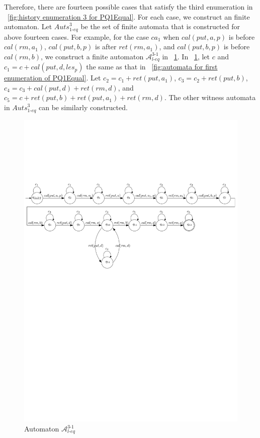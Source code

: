 Therefore, there are fourteen possible cases that satisfy the third enumeration in \figurename~\ref{fig:history enumeration 3 for PQ1Equal}. For each case, we construct an finite automaton. Let $\textit{Auts}_{\textit{1-eq}}^{3}$ be the set of finite automata that is constructed for above fourteen cases. For example, for the case $\textit{ca}_1$ when $\textit{cal}(\textit{put},a,p)$ is before $\textit{cal}(\textit{rm},a_1)$, $\textit{cal}(\textit{put},b,p)$ is after $\textit{ret}(\textit{rm},a_1)$, and $\textit{cal}(\textit{put},b,p)$ is before $\textit{cal}(\textit{rm},b)$, we construct a finite automaton $\mathcal{A}_{\textit{l-eq}}^{\textit{3-1}}$ in \figurename~\ref{fig:automata for ca1 of third enumeration of Rpr2}. In \figurename~\ref{fig:automata for ca1 of third enumeration of Rpr2}, let $c$ and $c_1 = c + \textit{cal}(\textit{put},d,\textit{les}_p)$ the same as that in \figurename~\ref{fig:automata for first enumeration of PQ1Equal}. Let $c_2 = c_1 + \textit{ret}(\textit{put},a_1)$, $c_3 = c_2 + \textit{ret}(\textit{put},b)$, $c_4 = c_3 + \textit{cal}(\textit{put},d) + \textit{ret}(\textit{rm},d)$, and $c_5 = c + \textit{ret}(\textit{put},b) + \textit{ret}(\textit{put},a_1) + \textit{ret}(\textit{rm},d)$. The other witness automata in $\textit{Auts}_{\textit{1-eq}}^{3}$ can be similarly constructed.

\begin{figure}[htbp]
  \centering
  \includegraphics[width=0.8 \textwidth]{figures/PIC_AUTO_PQ1Equ-3-1.pdf}
  \caption{Automaton $\mathcal{A}_{\textit{l-eq}}^{\textit{3-1}}$}
  \label{fig:automata for ca1 of third enumeration of Rpr2}
\end{figure}

